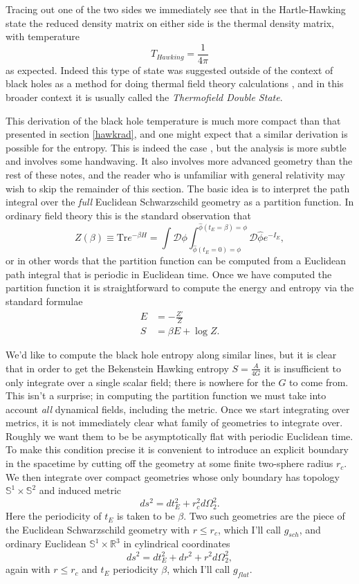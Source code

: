 \documentclass[12pt]{article}
\newcommand{\be}{\begin{equation}}
\newcommand{\ee}{\end{equation}}
\begin{document}
Tracing out one of the two sides we immediately see that in the Hartle-Hawking state the reduced density matrix on either side is the thermal density  matrix, with temperature
\be
T_{\mathit{Hawking}}=\frac{1}{4\pi}
\ee
as expected.  Indeed this type of state was suggested outside of the context of black holes as a method for doing thermal field theory calculations \cite{Takahashi:1996zn}, and in this broader context it is usually called the \textit{Thermofield Double State}.

This derivation of the black hole temperature is much more compact than that presented in section \ref{hawkrad}, and one might expect that a similar derivation is possible for the entropy.  This is indeed the case \cite{Gibbons:1976ue}, but the analysis is more subtle and involves some handwaving.  It also involves more advanced geometry than the rest of these notes, and the reader who is unfamiliar with general relativity may wish to skip the remainder of this section.  The basic idea is to interpret the path integral over the \textit{full} Euclidean Schwarzschild geometry as a partition function.  In ordinary field theory this is the standard observation that
\be\label{partf}
Z(\beta)\equiv \mathrm{Tr} e^{-\beta H}=\int \mathcal{D}\phi \int_{\hat{\phi}(t_E=0)=\phi}^{\hat{\phi}(t_E=\beta)=\phi} \mathcal{D}\hat{\phi}e^{-I_E},
\ee 
or in other words that the partition function can be computed from a Euclidean path integral that is periodic in Euclidean time.  Once we have computed the partition function it is straightforward to compute the energy and entropy via the standard formulae
\begin{align}\nonumber
E&=-\frac{Z'}{Z}\\
S&=\beta E+\log Z.\label{statmech}
\end{align}

We'd like to compute the black hole entropy along similar lines, but it is clear that in order to get the Bekenstein Hawking entropy $S=\frac{A}{4G}$ it is insufficient to only integrate over a single scalar field; there is nowhere for the $G$ to come from.  This isn't a surprise; in computing the partition function we must take into account \textit{all} dynamical fields, including the metric.  Once we start integrating over metrics, it is not immediately clear what family of geometries to integrate over.  Roughly we want them to be be asymptotically flat with periodic Euclidean time.  To make this condition precise it is convenient to introduce an explicit boundary in the spacetime by cutting off the geometry at some finite two-sphere radius $r_c$.  We then integrate over compact geometries whose only boundary has topology $\mathbb{S}^1\times \mathbb{S}^2$ and induced metric
\be\label{minkbmet}
ds^2=dt_E^2+r_c^2 d\Omega_2^2.
\ee
Here the periodicity of $t_E$ is taken to be $\beta$.  Two such geometries are the piece of the Euclidean Schwarzschild geometry with $r\leq r_c$, which I'll call $g_{sch}$, and ordinary Euclidean $\mathbb{S}^1\times \mathbb{R}^3$ in cylindrical coordinates
\be
ds^2=dt_E^2+dr^2+r^2d \Omega_2^2,
\ee
again with $r\leq r_c$ and $t_E$ periodicity $\beta$, which I'll call $g_{flat}$.  
\end{document}
